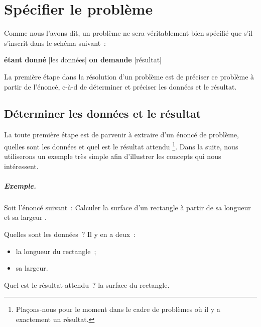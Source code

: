 \chapter{Spécifier le problème}

	Comme nous l’avons dit, 
	un problème ne sera véritablement bien spécifié 
	que s’il s’inscrit dans le schéma suivant~:
		
	\medskip
	\begin{center}
	\begin{Ovalbox}
		{\textbf{étant donné} [les données] 
		\textbf{on demande} [résultat]}
	\end{Ovalbox}
	\end{center}
	\medskip
	
	La première étape dans la résolution d’un problème est de
	préciser ce problème à partir de l’énoncé,
	c-à-d de déterminer et préciser les données et le résultat.
	
	\minitoc

	\section{Déterminer les données et le résultat}
	
		La toute première étape est de parvenir à extraire
		d’un énoncé de problème, quelles sont les données
		et quel est le résultat attendu%
		\footnote{%
			Plaçons-nous pour le moment dans le cadre
			de problèmes où il y a exactement un résultat.%
		}. Dans la suite, nous utiliserons un exemple très simple afin 
		d'illustrer les concepts qui nous intéressent. 
	
		\begin{Emphase}
			\paragraph{Exemple.}
			Soit l’énoncé suivant~:
			\og
				Calculer la surface d’un rectangle 
				à partir de sa longueur et sa largeur
			\fg.
			
			Quelles sont les données~? Il y en a deux~:	
			\begin{itemize}
				\item la longueur du rectangle~;
				\item sa largeur.
			\end{itemize}
		
			Quel est le résultat attendu~? la surface du rectangle.
		\end{Emphase}
		
